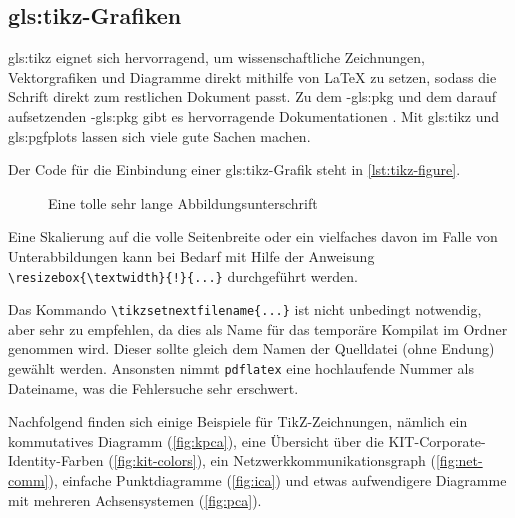 \subsection[TikZ-Grafiken]{\gls{gls:tikz}-Grafiken}%
\label{sec:TikZ}
%
\Gls{gls:tikz} eignet sich hervorragend, um wissenschaftliche Zeichnungen,
Vektorgrafiken und Diagramme direkt mithilfe von LaTeX
zu setzen, sodass die Schrift direkt zum restlichen Dokument passt.
Zu dem -\gls{gls:pkg} und dem darauf aufsetzenden -\gls{gls:pkg} gibt
es hervorragende Dokumentationen \parencites{Tantau2013}{Feuersaenger2014}.
Mit \gls{gls:tikz} und \gls{gls:pgfplots} lassen sich viele gute Sachen machen.
%

Der Code für die Einbindung einer \gls{gls:tikz}-Grafik steht in \cref{lst:tikz-figure}.
\begin{latex}[caption={Einbindung einer TikZ-Zeichnung in LaTeX},label={lst:tikz-figure}]
\begin{figure}[H]%
  \centering%
  \resizebox{\textwidth}{!}{%
  }%
  \caption[Kurzversion für das Abbildungsverzeichnis]{%
           Eine tolle sehr lange Abbildungsunterschrift}%
  \label{fig:my-tikz-figure}%
\end{figure}
\end{latex}

Eine Skalierung auf die volle Seitenbreite oder ein vielfaches davon im Falle von Unterabbildungen kann bei Bedarf mit Hilfe der Anweisung
\lstinline|\resizebox{\textwidth}{!}{...}|
durchgeführt werden.

Das Kommando \lstinline|\tikzsetnextfilename{...}| ist nicht unbedingt notwendig,
 aber sehr zu empfehlen, da dies als Name für das temporäre Kompilat im Ordner
 genommen wird.
Dieser sollte gleich dem Namen der Quelldatei (ohne Endung) gewählt werden.
Ansonsten nimmt \texttt{pdflatex} eine hochlaufende Nummer als Dateiname,
was die Fehlersuche sehr erschwert.

Nachfolgend finden sich einige Beispiele für TikZ-Zeichnungen, nämlich
ein kommutatives Diagramm (\cref{fig:kpca}),
eine Übersicht über die KIT-Corporate-Identity-Farben (\cref{fig:kit-colors}),
ein Netzwerkkommunikationsgraph (\cref{fig:net-comm}),
einfache Punktdiagramme (\cref{fig:ica})
und etwas aufwendigere Diagramme mit mehreren
Achsensystemen (\cref{fig:pca}).


